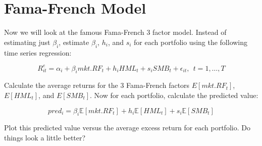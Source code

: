 \documentclass[11pt]{article}
\begin{document}
\section{Fama-French Model}
\label{sec-2}

Now we will look at the famous Fama-French 3 factor model. Instead of
estimating just $\beta_{i}$, estimate $\beta_{i}$, $h_{i}$, and
$s_{i}$ for each portfolio using the following time series regression:

\begin{equation*}
R^{e}_{it} = \alpha_{i} + \beta_{i} mkt.RF_{t} + h_{i} HML_{t} + s_{i} SMB_{t} + \epsilon_{it}, \ \ t=1,\ldots,T
\end{equation*}

Calculate the average returns for the 3 Fama-French factors
$E[mkt.RF_{t}]$, $E[HML_{t}]$, and $E[SMB_{t}]$. Now for each
portfolio, calculate the predicted value:

\begin{equation*}
pred_{i} = \beta_{i} \mathbb{E}[mkt.RF_{t}] + h_{i} \mathbb{E}[HML_{t}] + s_{i} \mathbb{E}[SMB_{t}]
\end{equation*}

Plot this predicted value versus the average excess return for each
portfolio. Do things look a little better?
\end{document}
